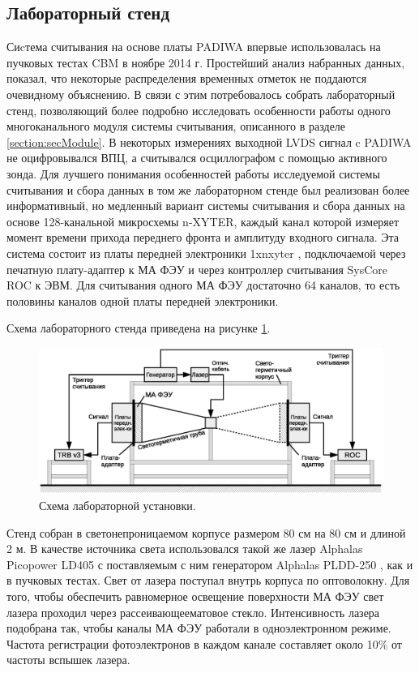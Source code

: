 \subsection{Лабораторный стенд}

Сиcтема считывания на основе платы PADIWA впервые использовалась на пучковых тестах CBM в ноябре 2014 г. Простейший анализ набранных данных, показал, что некоторые распределения временных отметок не поддаются очевидному объяснению. В связи с этим потребовалось собрать лабораторный стенд, позволяющий более подробно исследовать особенности работы одного многоканального модуля системы считывания, описанного в разделе \ref{section:secModule}. В некоторых измерениях выходной LVDS сигнал c PADIWA не оцифровывался ВПЦ, а считывался осциллографом с помощью активного зонда. Для лучшего понимания особенностей работы исследуемой системы считывания и сбора данных в том же лабораторном стенде был реализован более информативный, но медленный вариант системы считывания и сбора данных на основе 128-канальной микросхемы n-XYTER, каждый канал которой измеряет момент времени прихода переднего фронта и амплитуду входного сигнала. Эта система состоит из платы передней электроники 1xnxyter \cite{}, подключаемой через печатную плату-адаптер к МА ФЭУ и через контроллер считывания SysCore ROC \cite{} к ЭВМ. Для считывания одного МА ФЭУ достаточно 64 каналов, то есть половины каналов одной платы передней электроники.

Схема лабораторного стенда приведена на рисунке \ref{fig:LabSetup}.

\begin{figure}
\includegraphics[width=1.0\textwidth]{pictures/12_Lab_setup_3_rus.eps}
\caption{Схема лабораторной установки.}
\label{fig:LabSetup}
\end{figure}

Стенд собран в светонепроницаемом корпусе размером 80 см на 80 см и длиной 2 м. В качестве источника света использовался такой же лазер Alphalas Picopower LD405 \cite{} с поставляемым с ним генератором Alphalas PLDD-250 \cite{}, как и в пучковых тестах. Свет от лазера поступал внутрь корпуса по оптоволокну. Для того, чтобы обеспечить равномерное освещение поверхности МА ФЭУ свет лазера проходил через рассеивающеематовое стекло. Интенсивность лазера подобрана так, чтобы каналы МА ФЭУ работали в одноэлектронном режиме. Частота регистрации фотоэлектронов в каждом канале составляет около 10\% от частоты вспышек лазера.

